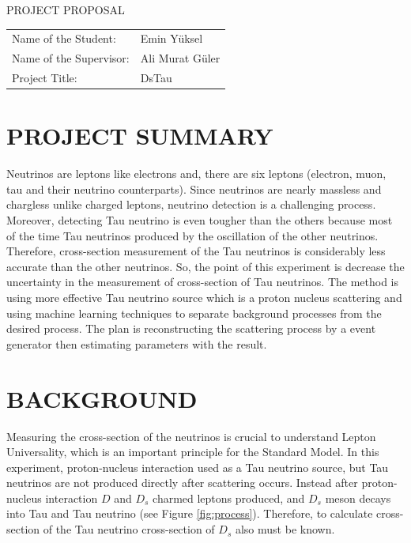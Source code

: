 \documentclass[12pt, letterpaper]{article}
\begin{document}
\begin{center}

{\LARGE PROJECT PROPOSAL}

\end{center}

\begin{tabular}{ p{9em} p{8em} }
\setlength{\parindent}{-2em}
Name of the Student: & Emin Yüksel\\
\setlength{\parindent}{-2em}
Name of the Supervisor: & Ali Murat Güler\\
\setlength{\parindent}{-2em}
Project Title: & DsTau\\
\end{tabular}

\section{PROJECT SUMMARY}

Neutrinos are leptons like electrons and, there are six leptons (electron, muon, tau and their neutrino counterparts). Since neutrinos are nearly massless and chargless unlike charged leptons, neutrino detection is a challenging process. Moreover, detecting Tau neutrino is even tougher than the others because most of the time Tau neutrinos produced by the oscillation of the other neutrinos. Therefore, cross-section measurement of the Tau neutrinos is considerably less accurate than the other neutrinos. So, the point of this experiment is decrease the uncertainty in the measurement of cross-section of Tau neutrinos. The method is using more effective Tau neutrino source which is a proton nucleus scattering and using machine learning techniques to separate background processes from the desired process. The plan is reconstructing the scattering process by a event generator then  estimating parameters with the result.

\section{BACKGROUND}
\label{sec:background}
Measuring the cross-section of the neutrinos is crucial to understand Lepton Universality, which is an important principle for the Standard Model. In this experiment, proton-nucleus interaction used as a Tau neutrino source, but Tau neutrinos are not produced directly after scattering occurs. Instead after proton-nucleus interaction $D$ and $D_s$ charmed leptons produced, and $D_s$ meson decays into Tau and Tau neutrino (see Figure \ref{fig:process}). Therefore, to calculate cross-section of the Tau neutrino cross-section of $D_s$ also must be known.~\cite{aoki_ariga_dmitrievsky_firu_forshaw_fukuda_gornushkin_guler_haiduc_2019}
\end{document}
